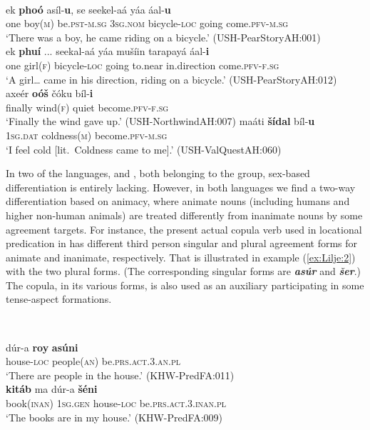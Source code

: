 \documentclass[output=collectionpaper]{langsci/langscibook}
\begin{document}
\ea
\label{ex:Lilje:1}
\\
\begin{xlist}
\ex
\gll ek \textbf{phoó} asíl-\textbf{u}, se seekel-aá yáa áal-\textbf{u}\\
one boy(\textsc{m}) be.\textsc{pst-m.sg} \textsc{3sg.nom} bicycle-\textsc{loc} going come.\textsc{pfv-m.sg}\\
\glt  `There was a boy, he came riding on a bicycle.' (USH-PearStoryAH:001)\\
\ex
\gll ek \textbf{phuí} ... seekal-aá yáa mušíin tarapayá áal-\textbf{i}\\
one girl(\textsc{f}) {} bicycle-\textsc{loc} going to.near in.direction come.\textsc{pfv-f.sg}\\
\glt `A girl… came in his direction, riding on a bicycle.' (USH-PearStoryAH:012)\\
\ex
\gll axeér \textbf{oóš} čóku bíl-\textbf{i}\\
finally wind(\textsc{f}) quiet become.\textsc{pfv-f.sg}    \\
\glt `Finally the wind gave up.' (USH-NorthwindAH:007)
\ex
\gll maáti \textbf{šídal} bíl-\textbf{u}\\
\textsc{1sg.dat} coldness(\textsc{m}) become.\textsc{pfv-m.sg}     \\
\glt `I feel cold [lit.\ Coldness came to me].' (USH-ValQuestAH:060)
\end{xlist}
\z

In two of the languages,  and , both belonging to the  group, sex-based differentiation is entirely lacking. However, in both languages we find a two-way differentiation based on animacy, where animate nouns (including humans and higher non-human animals) are treated differently from inanimate nouns by some agreement targets. For instance, the present actual copula verb used in locational predication in  has different third person singular and plural agreement forms for animate and inanimate, respectively. That is illustrated in example (\ref{ex:Lilje:2}) with the two plural forms. (The corresponding singular forms are \textbf{\textit{asú}}\textbf{\textit{r}} and \textbf{\textit{šer}}.) The copula, in its various forms, is also used as an auxiliary participating in some tense-aspect formations.

\ea
\label{ex:Lilje:2}
\\
\begin{xlist}
\ex
\gll dúr-a \textbf{roy}  \textbf{asúni}\\
house-\textsc{loc} people(\textsc{an}) be\textsc{.prs.act.3.an.}\textsc{pl}     \\
\glt `There are people in the house.' (KHW-PredFA:011)\\
\ex
\gll \textbf{kitáb}  ma dúr-a  \textbf{šéni}\\
book(\textsc{inan}) \textsc{1sg.gen} house-\textsc{loc} be\textsc{.prs.act.3.inan.pl}    \\
\glt `The books are in my house.' (KHW-PredFA:009)\\
\end{xlist}
\z
\end{document}
